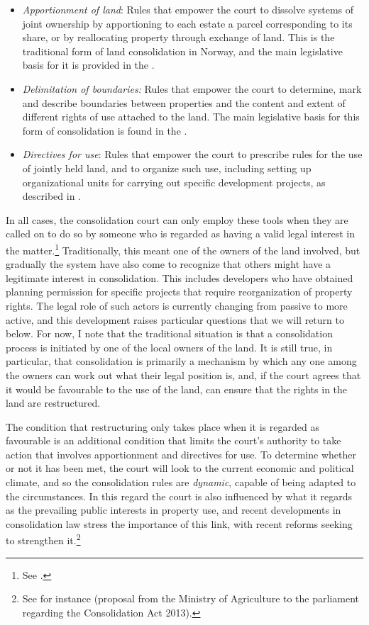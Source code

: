 \begin{itemize}
\item \emph{Apportionment of land}: Rules that empower the court to dissolve systems of joint ownership by apportioning to each estate a parcel corresponding to its share, or by reallocating property through exchange of land. This is the traditional form of land consolidation in Norway, and the main legislative basis for it is provided in the \cite[2 a)-b)]{lca79}.
\item \emph{Delimitation of boundaries:} Rules that empower the court to determine, mark and describe boundaries between properties and the content and extent of different rights of use attached to the land. The main legislative basis for this form of consolidation is found in the \cite[88]{lca79}.
\item \emph{Directives for use}: Rules that empower the court to prescribe rules for the use of jointly held land, and to organize such use, including setting up organizational units for carrying out specific development projects, as described in \cite[2 c)|34-35]{lca79}.
\end{itemize}

In all cases, the consolidation court can only employ these tools when they are called on to do so by someone who is regarded as having a valid legal interest in the matter.\footnote{See \cite[5]{lca79}.} Traditionally, this meant one of the owners of the land involved, but gradually the system have also come to recognize that others might have a legitimate interest in consolidation. This includes developers who have obtained planning permission for specific projects that require reorganization of property rights. The legal role of such actors is currently changing from passive to more active, and this development raises particular questions that we will return to below. For now, I note that the traditional situation is that a consolidation process is initiated by one of the local owners of the land. It is still true, in particular, that consolidation is primarily a mechanism by which any one among the owners can work out what their legal position is, and, if the court agrees that it would be favourable to the use of the land, can ensure that the rights in the land are restructured.

The condition that restructuring only takes place when it is regarded as favourable is an additional condition that limits the court's authority to take action that involves apportionment and directives for use. To determine whether or not it has been met, the court will look to the current economic and political climate, and so the consolidation rules are \emph{dynamic}, capable of being adapted to the circumstances. In this regard the court is also influenced by what it regards as the prevailing public interests in property use, and recent developments in consolidation law stress the importance of this link, with recent reforms seeking to strengthen it.\footnote{See for instance \cite{prop12} (proposal from the Ministry of Agriculture to the parliament regarding the Consolidation Act 2013).}


